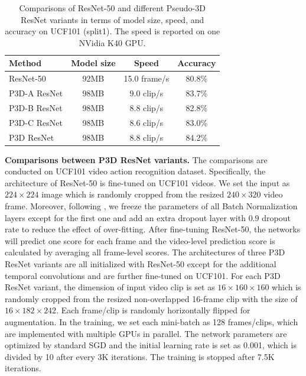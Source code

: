 \documentclass[10pt,twocolumn,letterpaper]{article}
\begin{document}
\begin{table}
\centering
\small
\caption{\small Comparisons of ResNet-50 and different Pseudo-3D ResNet variants in terms of model size, speed, and accuracy on UCF101 (split1). The speed is reported on one NVidia K40 GPU.}
\begin{tabular}{l|@{~~}c@{~~}|@{~~}c@{~~}|@{~~}c@{~~}} \hline
\textbf{Method}                                      & \textbf{Model size} & \textbf{Speed}  & \textbf{Accuracy} \\ \hline
ResNet-50                                            & 92MB                 & 15.0 frame/s    & 80.8\%           \\ \hline
P3D-A ResNet                                      & 98MB                 & 9.0 clip/s      & 83.7\%           \\
P3D-B ResNet                                      & 98MB                 & 8.8 clip/s      & 82.8\%           \\
P3D-C ResNet                                      & 98MB                 & 8.6 clip/s      & 83.0\%           \\ \hline
P3D ResNet                                        & 98MB                 & 8.8 clip/s      & 84.2\%           \\
\hline
\end{tabular}
\label{tab:s0m}
\vspace{-0.2in}
\end{table}


\textbf{Comparisons between P3D ResNet variants.} The comparisons are conducted on UCF101 \cite{UCF101} video action recognition dataset. Specifically, the architecture of ResNet-50 is fine-tuned on UCF101 videos. We set the input as $224\times224$ image which is randomly cropped from the resized $240\times320$ video frame. Moreover, following \cite{wang2016temporal}, we freeze the parameters of all Batch Normalization layers except for the first one and add an extra dropout layer with $0.9$ dropout rate to reduce the effect of over-fitting. After fine-tuning ResNet-50, the networks will predict one score for each frame and the video-level prediction score is calculated by averaging all frame-level scores. The architectures of three P3D ResNet variants are all initialized with ResNet-50 except for the additional temporal convolutions and are further fine-tuned on UCF101. For each P3D ResNet variant, the dimension of input video clip is set as $16\times160\times160$ which is randomly cropped from the resized non-overlapped 16-frame clip with the size of $16\times182\times242$. Each frame/clip is randomly horizontally flipped for augmentation. In the training, we set each mini-batch as 128 frames/clips, which are implemented with multiple GPUs in parallel. The network parameters are optimized by standard SGD and the initial learning rate is set as 0.001, which is divided by 10 after every 3K iterations. The training is stopped after 7.5K iterations.
\end{document}
